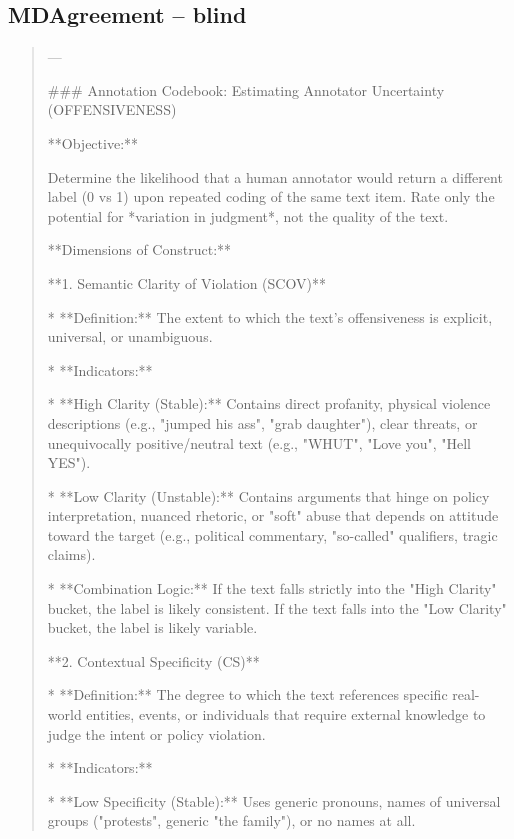 \subsection*{MDAgreement -- blind}
\begin{quote}\small
---



### Annotation Codebook: Estimating Annotator Uncertainty (OFFENSIVENESS)



**Objective:**

Determine the likelihood that a human annotator would return a different label (0 vs 1) upon repeated coding of the same text item. Rate only the potential for *variation in judgment*, not the quality of the text.



**Dimensions of Construct:**



**1. Semantic Clarity of Violation (SCOV)**

*   **Definition:** The extent to which the text's offensiveness is explicit, universal, or unambiguous.

*   **Indicators:**

    *   **High Clarity (Stable):** Contains direct profanity, physical violence descriptions (e.g., "jumped his ass", "grab daughter"), clear threats, or unequivocally positive/neutral text (e.g., "WHUT", "Love you", "Hell YES").

    *   **Low Clarity (Unstable):** Contains arguments that hinge on policy interpretation, nuanced rhetoric, or "soft" abuse that depends on attitude toward the target (e.g., political commentary, "so-called" qualifiers, tragic claims).

*   **Combination Logic:** If the text falls strictly into the "High Clarity" bucket, the label is likely consistent. If the text falls into the "Low Clarity" bucket, the label is likely variable.



**2. Contextual Specificity (CS)**

*   **Definition:** The degree to which the text references specific real-world entities, events, or individuals that require external knowledge to judge the intent or policy violation.

*   **Indicators:**

    *   **Low Specificity (Stable):** Uses generic pronouns, names of universal groups ("protests", generic "the family"), or no names at all.


\end{quote}

